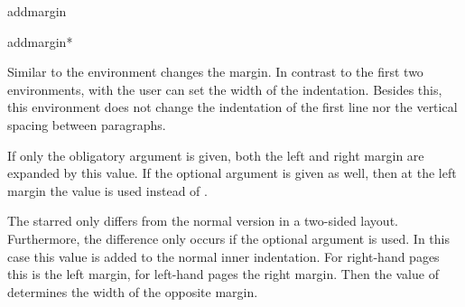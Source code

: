 \begin{Declaration}
  \begin{Environment}{addmargin}
  \end{Environment}
  \begin{Environment}{addmargin*}
  \end{Environment}
\end{Declaration}
Similar to %
the  environment changes the margin.  In
contrast to the first two environments, with  the user
can set the width of the indentation. Besides this, this environment does not
change the indentation of the first line nor the vertical spacing between
paragraphs.

If only the obligatory argument  is given, both the
left and right margin are expanded by this value. If the optional
argument  is given as well, then at the left
margin the value  is used instead of
.

The starred  only differs from the normal
version in a two-sided layout. Furthermore, the difference only occurs
if the optional argument  is used. In this
case this value  is added to the normal inner
indentation. For right-hand pages this is the left margin, for
left-hand pages the right margin. Then the value of
 determines the width of the opposite margin.


